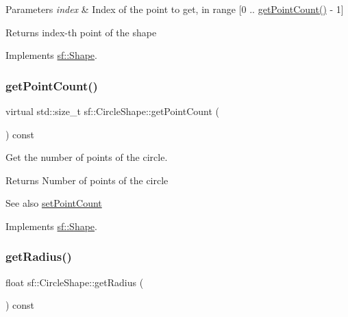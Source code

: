 \begin{DoxyParams}{Parameters}
{\em index} & Index of the point to get, in range \mbox{[}0 .. \hyperlink{classsf_1_1_circle_shape_a014d29ec11e8afa4dce50e7047d99601}{get\+Point\+Count()} -\/ 1\mbox{]}\\
\hline
\end{DoxyParams}
\begin{DoxyReturn}{Returns}
index-\/th point of the shape 
\end{DoxyReturn}


Implements \hyperlink{classsf_1_1_shape_a40e5d83713eb9f0c999944cf96458085}{sf\+::\+Shape}.

\mbox{\label{classsf_1_1_circle_shape_a014d29ec11e8afa4dce50e7047d99601}} 
\subsubsection{\texorpdfstring{get\+Point\+Count()}{getPointCount()}}
{\footnotesize\ttfamily virtual std\+::size\+\_\+t sf\+::\+Circle\+Shape\+::get\+Point\+Count (\begin{DoxyParamCaption}{ }\end{DoxyParamCaption}) const\hspace{0.3cm}{\ttfamily [virtual]}}



Get the number of points of the circle. 

\begin{DoxyReturn}{Returns}
Number of points of the circle
\end{DoxyReturn}
\begin{DoxySeeAlso}{See also}
\hyperlink{classsf_1_1_circle_shape_a16590ee7bdf5c9f752275468a4997bed}{set\+Point\+Count} 
\end{DoxySeeAlso}


Implements \hyperlink{classsf_1_1_shape_af988dd61a29803fc04d02198e44b5643}{sf\+::\+Shape}.

\mbox{\label{classsf_1_1_circle_shape_aa3dd5a1b5031486ce5b6f09d43674aa3}} 
\subsubsection{\texorpdfstring{get\+Radius()}{getRadius()}}
{\footnotesize\ttfamily float sf\+::\+Circle\+Shape\+::get\+Radius (\begin{DoxyParamCaption}{ }\end{DoxyParamCaption}) const}



